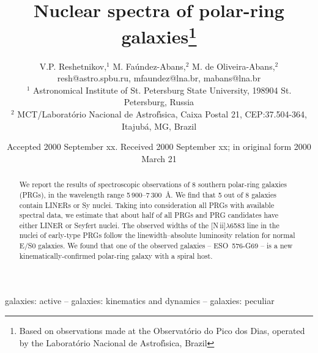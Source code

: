 


\title[Nuclear   spectra   of   PRGs]{Nuclear   spectra   of   polar-ring
galaxies\thanks{Based  on observations made at the Observat\'{o}rio do Pico
dos Dias,  operated by the  Laborat\'{o}rio  Nacional de  Astrof\'{\i}sica,
Brazil}}

\author[Reshetnikov       et       al.]{V.P.      Reshetnikov,$^1$       M.
Fa\'{u}ndez-Abans,$^2$  M.  de  Oliveira-Abans,$^2$\\   resh@astro.spbu.ru,
mfaundez@lna.br,  mabans@lna.br  \\  $^1$  Astronomical  Institute  of  St.
Petersburg  State  University,  198904  St.  Petersburg,   Russia  \\  $^2$
MCT/Laborat\'{o}rio   Nacional  de   Astrof\'{\i}sica,   Caixa  Postal  21,
CEP:37.504-364, Itajub\'{a}, MG, Brazil}

\date{Accepted  2000 September xx.  Received 2000 September xx; in original
form 2000 March 21}

\pagerange{\pageref{firstpage}--\pageref{lastpage}}

\maketitle

\label{firstpage}

\begin{abstract}

We  report  the  results  of  spectroscopic   observations  of  8  southern
polar-ring galaxies (PRGs), in the wavelength range 5\,900--7\,300~\AA.  We
find that 5 out of 8 galaxies  contain  LINERs or Sy  nuclei.  Taking  into
consideration all PRGs with available spectral data, we estimate that about
half of all PRGs and PRG  candidates  have either LINER or Seyfert  nuclei.
The observed widths of the [N\,{\sc ii}]$\lambda$6583 line in the nuclei of
early-type  PRGs follow the  linewidth--absolute  luminosity  relation  for
normal E/S0 galaxies.  We found that one of the observed  galaxies --
ESO~576-G69 -- is a new  kinematically-confirmed  polar-ring  galaxy with a
spiral host.

\end{abstract}

\begin{keywords}

galaxies:  active  --  galaxies:  kinematics   and  dynamics  --  galaxies:
peculiar

\end{keywords}
 
